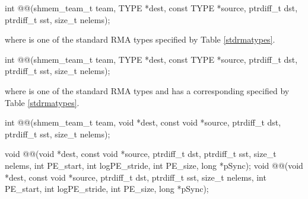 
\begin{apidefinition}

{\color{Green}
\begin{C11synopsis}
int @@(shmem_team_t team, TYPE *dest, const TYPE *source, ptrdiff_t dst, ptrdiff_t sst, size_t nelems);
\end{C11synopsis}
where \TYPE{} is one of the standard \ac{RMA} types specified by Table \ref{stdrmatypes}.
}

\begin{Csynopsis}
\end{Csynopsis}
{\color{Green}
\begin{CsynopsisCol}
int @@(shmem_team_t team, TYPE *dest, const TYPE *source, ptrdiff_t dst, ptrdiff_t sst, size_t nelems);
\end{CsynopsisCol}
where \TYPE{} is one of the standard \ac{RMA} types and has a corresponding \TYPENAME{} specified by Table \ref{stdrmatypes}.

\begin{CsynopsisCol}
int @@(shmem_team_t team, void *dest, const void *source, ptrdiff_t dst, ptrdiff_t sst, size_t nelems);
\end{CsynopsisCol}
}

\begin{DeprecateBlock}
\begin{CsynopsisCol}
void @@(void *dest, const void *source, ptrdiff_t dst, ptrdiff_t sst, size_t nelems, int PE_start, int logPE_stride, int PE_size, long *pSync);
void @@(void *dest, const void *source, ptrdiff_t dst, ptrdiff_t sst, size_t nelems, int PE_start, int logPE_stride, int PE_size, long *pSync);
\end{CsynopsisCol}
\end{DeprecateBlock}

\begin{apiarguments}


    

\end{apiarguments}
\end{apidefinition}
